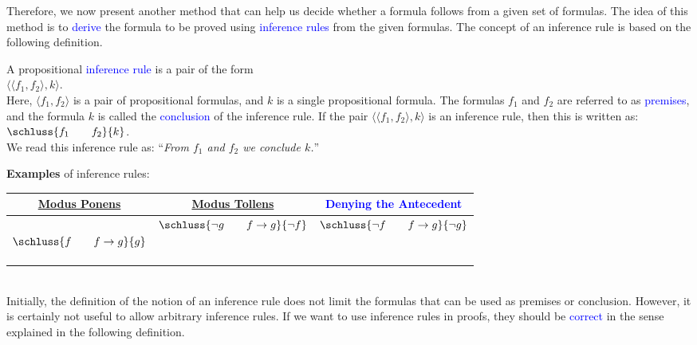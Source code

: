 Therefore, we now present another method that can help us decide
whether a formula follows from a given set of formulas. The idea of this method
is to \textcolor{blue}{derive} the formula to be proved using \textcolor{blue}{inference rules} from the
given formulas. The concept of an inference rule is based on the following definition. 
\begin{Definition} \hspace*{\fill} \linebreak
    A propositional \textcolor{blue}{inference rule} is a pair of the form  
    \\[0.2cm]
    \hspace*{1.3cm}
    $\bigl\langle \langle f_1, f_2 \rangle, k \bigr\rangle$.    
    \\[0.2cm]
    Here, $\langle f_1, f_2 \rangle$ is a pair of propositional formulas, and $k$ is a
    single propositional formula.   The formulas $f_1$ and $f_2$ are referred to as
    \textcolor{blue}{premises}, and the formula $k$ is called the \textcolor{blue}{conclusion} of the inference
    rule. If the pair $\bigl\langle \langle f_1, f_2 \rangle, k \bigr\rangle$ is an inference rule, then this is written as: 
    \\[0.3cm]
    \hspace*{1.3cm}      
    $\schluss{f_1 \qquad f_2}{k}$.
    \\[0.3cm]
    We read this inference rule as: 
    ``\textsl{From $f_1$ and $f_2$ we  conclude $k$.}''
    \eox
\end{Definition}

\noindent
\textbf{Examples} of inference rules:
\\[0.2cm]
\hspace*{1.3cm}            
\begin{tabular}[t]{|c|c|c|}
\hline
\rule{0pt}{15pt} \href{https://en.wikipedia.org/wiki/Modus_ponens}{Modus Ponens} & \href{https://en.wikipedia.org/wiki/Modus_tollens}{Modus Tollens} & \textcolor{blue}{Denying the Antecedent} \\[0.3cm]
\hline
$
\rule[-15pt]{0pt}{40pt}\schluss{f \quad\quad f \rightarrow g}{g}$ &
$\schluss{\neg g \quad\quad f \rightarrow g}{\neg f}$ &
$\schluss{\neg f \quad\quad f \rightarrow g}{\neg g}$ \\[0.3cm]
\hline
\end{tabular}
\\[0.3cm]

\noindent
Initially, the definition of the notion of an inference rule does not limit the formulas that can be used as premises
or conclusion. However, it is certainly not useful to allow arbitrary inference rules. If we want to use
inference rules in proofs, they should be \textcolor{blue}{correct} in the sense explained in the following definition.

